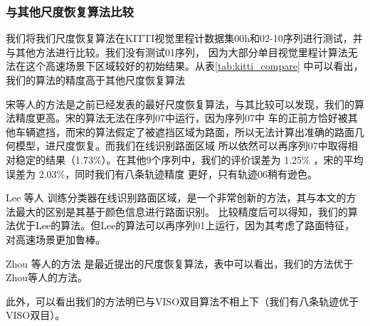 \subsubsection{与其他尺度恢复算法比较}
\label{sec:overall_evaluation}
我们将我们尺度恢复算法在KITTI视觉里程计数据集00h和02-10序列进行测试，并与其他方法进行比较。我们没有测试01序列，
因为大部分单目视觉里程计算法无法在这个高速场景下区域较好的初始结果。从表\ref{tab:kitti_compare} 中可以看出，
我们的算法的精度高于其他尺度恢复算法

宋等人\cite{Song2015MoncularScale}的方法是之前已经发表的最好尺度恢复算法，与其比较可以发现，我们的算法精度更高。宋的算法无法在序列07中运行，因为序列07中
车的正前方恰好被其他车辆遮挡，而宋的算法假定了被遮挡区域为路面，所以无法计算出准确的路面几何模型，进尺度恢复。而我们在线识别路面区域
所以依然可以再序列07中取得相对稳定的结果（1.73\%）。在其他9个序列中，我们的评价误差为 1.25\% ，宋的平均误差为 2.03\%，同时我们有八条轨迹精度
更好，只有轨迹06稍有逊色。

Lee 等人\cite{Lee2015MoncularScale} 训练分类器在线识别路面区域，是一个非常创新的方法，其与本文的方法最大的区别是其基于颜色信息进行路面识别。
比较精度后可以得知，我们的算法优于Lee的算法。但Lee的算法可以再序列01上运行，因为其考虑了路面特征，对高速场景更加鲁棒。

Zhou 等人的方法\cite{zhou2016reliable} 是最近提出的尺度恢复算法，表中可以看出，我们的方法优于Zhou等人的方法。

此外，可以看出我们的方法明已与VISO双目算法不相上下（我们有八条轨迹优于VISO双目）。



